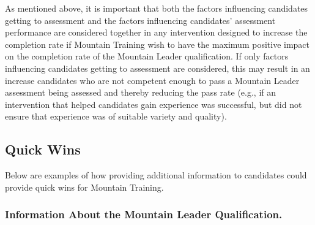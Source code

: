 \documentclass[
  12pt,
  a4paper,
]{book}
\begin{document}
As mentioned above, it is important that both the factors influencing candidates getting to assessment and the factors influencing candidates' assessment performance are considered together in any intervention designed to increase the completion rate if Mountain Training wish to have the maximum positive impact on the completion rate of the Mountain Leader qualification. If only factors influencing candidates getting to assessment are considered, this may result in an increase candidates who are not competent enough to pass a Mountain Leader assessment being assessed and thereby reducing the pass rate (e.g., if an intervention that helped candidates gain experience was successful, but did not ensure that experience was of suitable variety and quality).

\hypertarget{quick-wins}{%
\subsection{Quick Wins}\label{quick-wins}}

Below are examples of how providing additional information to candidates could provide quick wins for Mountain Training.

\hypertarget{information-about-the-mountain-leader-qualification.}{%
\subsubsection{Information About the Mountain Leader Qualification.}\label{information-about-the-mountain-leader-qualification.}}
\end{document}
